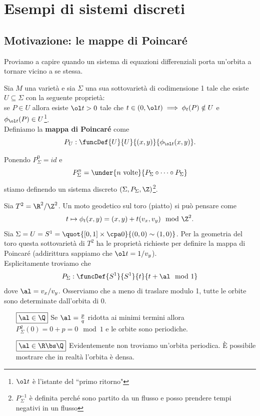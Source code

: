 \chapter{Esempi di sistemi discreti}
\section{Motivazione: le mappe di Poincar\'e}
Proviamo a capire quando un sistema di equazioni differenziali porta un'orbita a tornare vicino a se stessa.

\begin{definition}
Sia $M$ una variet\`a e sia $\Sigma$ una sua sottovariet\`a di codimensione 1 tale che esiste $U\subseteq \Sigma$ con la seguente propriet\`a:\\
se $P\in U$ allora esiste $\ol t>0$ tale che $t\in (0,\ol t)\implies \phi_t(P)\notin U$ e $\phi_{\ol t}(P)\in U$\footnote{$\ol t$ \`e l'istante del ``primo ritorno"}.\\
Definiamo la \textbf{mappa di Poincar\'e} come
\[P_U:\funcDef{U}{U}{(x,y)}{\phi_{\ol t}(x,y)}.\]
\end{definition}
\begin{remark}
Ponendo $P_\Sigma^0=id$ e
\[P_\Sigma^n=\under{n\text{ volte}}{P_\Sigma\circ\cdots\circ P_\Sigma}\]
stiamo definendo un sistema discreto $(\Sigma,P_\Sigma,\Z)$\footnote{$P_\Sigma^{-1}$ \`e definita perch\'e sono partito da un flusso e posso prendere tempi negativi in un flusso}.
\end{remark}

\begin{example}
Sia $T^2=\R^2/\Z^2$. Un moto geodetico sul toro (piatto) si pu\`o pensare come
\[t\mapsto \phi_t(x,y)=(x,y)+t(v_x,v_y)\mod{\Z^2}.\]
Sia $\Sigma=U=S^1=\quot{[0,1]\times\cpa0}{(0,0)\sim(1,0)}$. Per la geometria del toro questa sottovariet\`a di $T^2$ ha le propriet\`a richieste per definire la mappa di Poincar\'e (addirittura sappiamo che $\ol t=1/v_y$).\\
Esplicitamente troviamo che 
\[P_\Sigma:\funcDef{S^1}{S^1}{t}{t+\al \mod 1}\]
dove $\al=v_x/v_y$. Osserviamo che a meno di traslare modulo 1, tutte le orbite sono determinate dall'orbita di $0$.
\setlength{\leftmargini}{0cm}
\begin{itemize}
\item[$\boxed{\al\in\Q}$] Se $\al=\frac pq$ ridotta ai minimi termini allora $P_\Sigma^q(0)=0+p=0 \mod 1$ e le orbite sono periodiche.
\item[$\boxed{\al\in\R\bs\Q}$] Evidentemente non troviamo un'orbita periodica. \`E possibile mostrare che in realt\`a l'orbita \`e densa.
\end{itemize}
\setlength{\leftmargini}{0.5cm}
\end{example}


